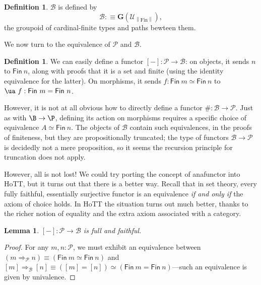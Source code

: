 \documentclass[preprint,authoryear]{sigplanconf}
\newcommand{\pref}[1]{\prettyref{#1}}
\newcommand{\mcal}[1]{\ensuremath{\mathcal{#1}}}
\let\oldequiv\equiv
\newcommand{\jeq}{\oldequiv}          %
\newcommand{\defeq}{\mathrel{:\jeq}}  %
\renewcommand{\equiv}{\simeq}         %
\newtheorem{lem}[thm]{Lemma}
\theoremstyle{definition}
\newtheorem{defn}[thm]{Definition}
\theoremstyle{remark}
\newcommand{\cons}[1]{\ensuremath{\mathsf{#1}}}
\newcommand{\Type}{\ensuremath{\mathcal{U}}}
\newcommand{\FinTypeT}{\ensuremath{\Type_{\ptrunc{\text{Fin}}}}}
\newcommand{\sizesymb}{\#}
\newcommand{\size}[1]{\ensuremath{\sizesymb#1}}
\newcommand{\Fin}[1]{\ensuremath{\cons{Fin}\ #1}}
\newcommand{\ptrunc}[1]{\ensuremath{\left\|#1\right\|}}
\newcommand{\tygrpd}[1]{\ensuremath{\mathbf{G}(#1)}}
\newcommand{\homsymb}{\Rightarrow}
\providecommand{\hom}{}
\renewcommand{\hom}[3][]{#2 \homsymb_{#1} #3}
\newcommand{\BT}{\mcal{B}}
\newcommand{\PT}{\mcal{P}}
\newcommand{\fin}[1]{\ensuremath{[#1]}}
\begin{document}
\begin{defn}
  $\BT$ is defined by \[ \BT \defeq \tygrpd{\FinTypeT}, \] the
  groupoid of cardinal-finite types and paths bewteen them.
\end{defn}


We now turn to the equivalence of $\PT$ and $\BT$.

\begin{defn}
  We can easily define a functor $\fin - : \PT \to \BT$: on objects,
  it sends $n$ to $\Fin n$, along with proofs that it is a set and
  finite (using the identity equivalence for the latter).  On
  morphisms, it sends $f : \Fin m \equiv \Fin n$ to $\ua\ f : \Fin m =
  \Fin n$.
\end{defn}

However, it is not at all obvious how to directly define a functor
$\size : \BT \to \PT$. Just as with $\B \to \P$, defining its action
on morphisms requires a specific choice of equivalence $A \equiv \Fin
n$. The objects of $\BT$ contain such equivalences, in the proofs of
finiteness, but they are propositionally truncated; the type of
functors $\BT \to \PT$ is decidedly not a mere proposition, so it
seems the recursion principle for truncation does not apply.

However, all is not lost!  We could try porting the concept of
anafunctor into HoTT, but it turns out that there is a better way.
Recall that in set theory, every fully faithful, essentially
surjective functor is an equivalence \emph{if and only if} the axiom
of choice holds.  In HoTT the situation turns out much better, thanks
to the richer notion of equality and the extra axiom associated with a
category.

\begin{lem}
  $\fin - : \PT \to \BT$ is full and faithful.
\end{lem}
\begin{proof}
  For any $m, n : \PT$, we must exhibit an equivalence between
  $(\hom[\PT] m n) \jeq (\Fin m \equiv \Fin n)$ and $\hom[\BT] {\fin
    m} {\fin n} \jeq (\fin m = \fin n) \equiv (\Fin m = \Fin
  n)$---such an equivalence is given by univalence.
\end{proof}
\end{document}
